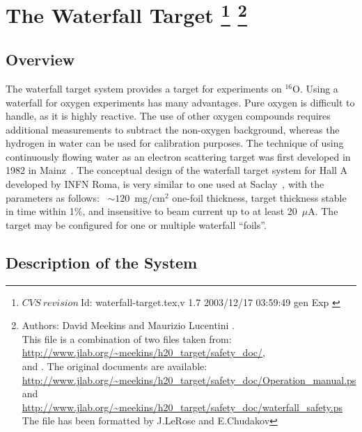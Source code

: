 \chapter[The Waterfall Target]{The Waterfall Target
\footnote{
  $CVS~revision~ $Id: waterfall-target.tex,v 1.7 2003/12/17 03:59:49 gen Exp $ $
}
\footnote{Authors: David Meekins  and 
 Maurizio Lucentini . \\
 This file is a combination of two files taken from: \\
 \url{http://www.jlab.org/~meekins/h20_target/safety_doc/},\\
   and .
  The original documents are available:\\
 \url{http://www.jlab.org/~meekins/h20_target/safety_doc/Operation_manual.ps} and\\
 \url{http://www.jlab.org/~meekins/h20_target/safety_doc/waterfall_safety.ps}\\
 The file has been formatted by J.LeRose 
 and E.Chudakov 
}}

\section{Overview}
\label{sec:wt_overview}

The waterfall target system provides a target for experiments on 
$^{16}$O. Using a waterfall for oxygen experiments has many advantages. Pure 
oxygen is difficult to handle, as it is highly reactive. The use of other 
oxygen compounds requires additional measurements to subtract the non-oxygen 
background, whereas the hydrogen in water can be used for calibration purposes.
The technique of using continuously flowing water as an electron scattering 
target was first developed in 1982 in Mainz~\cite{Voegler:1982}.
The conceptual design of the waterfall target system for Hall A
developed by INFN Roma, 
is very similar to one used at Saclay~\cite{Garibaldi:1992mb},
with the parameters as follows: ~$\sim 120$~mg/cm$^{2}$ one-foil thickness,
target thickness stable in time within 1\%, and insensitive
to beam current up to at least 20~$\mu$A.
The target may be configured for one or multiple waterfall 
``foils''. 


\section{Description of the System}
\label{sec:wt_descrip_sys}

